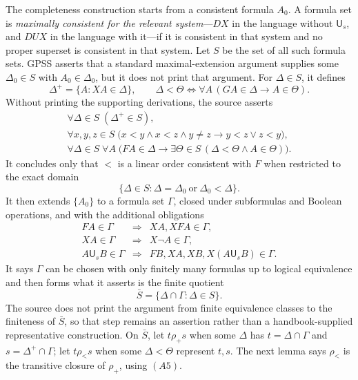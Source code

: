 The completeness construction starts from a consistent formula \(A_0\).  A
formula set is \emph{maximally consistent for the relevant system}---\(DX\) in
the language without \(\mathsf U_s\), and \(DUX\) in the language with it---if
it is consistent in that system and no proper superset is consistent in that
system.  Let \(S\) be the
set of all such formula sets.  GPSS asserts that a standard maximal-extension
argument supplies some \(\Delta_0\in S\) with \(A_0\in\Delta_0\), but it does
not print that argument.  For \(\Delta\in S\), it defines
\[
 \Delta^+=\{A:XA\in\Delta\},
 \qquad
 \Delta<\Theta
 \Longleftrightarrow
 \forall A\,(GA\in\Delta\to A\in\Theta).
\]
Without printing the supporting derivations, the source asserts
\[
\begin{gathered}
 \forall\Delta\in S\;(\Delta^+\in S),\\
 \forall x,y,z\in S\;
 \bigl(x<y\land x<z\land y\ne z
       \to y<z\lor z<y\bigr),\\
 \forall\Delta\in S\;\forall A\;
 \bigl(FA\in\Delta\to
       \exists\Theta\in S\,
       (\Delta<\Theta\land A\in\Theta)\bigr).
\end{gathered}
\]
It concludes only that \(<\) is a linear order consistent with \(F\) when
restricted to the exact domain
\[
 \{\Delta\in S:\Delta=\Delta_0\ \text{or}\ \Delta_0<\Delta\}.
\]
It then extends \(\{A_0\}\) to a formula set \(\Gamma\), closed under
subformulas and Boolean operations, and with the additional obligations
\[
\begin{array}{lll}
 FA\in\Gamma&\Longrightarrow&XA,XFA\in\Gamma,\\
 XA\in\Gamma&\Longrightarrow&X\neg A\in\Gamma,\\
 A\mathbin{\mathsf U_s}B\in\Gamma&\Longrightarrow&
 FB,XA,XB,X(A\mathbin{\mathsf U_s}B)\in\Gamma.
\end{array}
\]
It says \(\Gamma\) can be chosen with only finitely many formulas up to logical
equivalence and then forms what it asserts is the finite quotient
\[
 \bar S=\{\Delta\cap\Gamma:\Delta\in S\}.
\]
The source does not print the argument from finite equivalence classes to the
finiteness of \(\bar S\), so that step remains an assertion rather than a
handbook-supplied representative construction.
On \(\bar S\), let \(t\mathrel{\rho_+}s\) when some \(\Delta\) has
\(t=\Delta\cap\Gamma\) and \(s=\Delta^+\cap\Gamma\); let
\(t\mathrel{\rho_<}s\) when some \(\Delta<\Theta\) represent \(t,s\).
The next lemma says \(\rho_<\) is the transitive closure of \(\rho_+\), using
\((A5)\).

